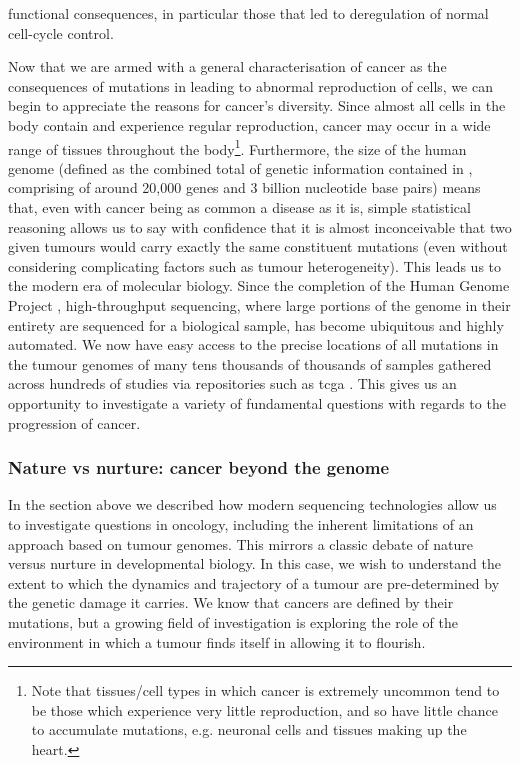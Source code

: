 \documentclass[thesis.tex]{subfiles}
\begin{document}
functional consequences, in particular those that led to deregulation of normal cell-cycle control.

Now that we are armed with a general characterisation of cancer as the consequences of mutations in  leading to abnormal reproduction of cells, we can begin to appreciate the reasons for cancer's diversity. Since almost all cells in the body contain  and experience regular reproduction, cancer may occur in a wide range of tissues throughout the body\footnote{Note that tissues/cell types in which cancer is extremely uncommon tend to be those which experience very little reproduction, and so have little chance to accumulate mutations, e.g. neuronal cells and tissues making up the heart.}. Furthermore, the size of the human genome (defined as the combined total of genetic information contained in , comprising of around 20,000 genes and 3 billion nucleotide base pairs) means that, even with cancer being as common a disease as it is, simple statistical reasoning allows us to say with confidence that it is almost inconceivable that two given tumours would carry exactly the same constituent mutations (even without considering complicating factors such as tumour heterogeneity). This leads us to the modern era of molecular biology. Since the completion of the Human Genome Project \citep{lander_initial_2001}, high-throughput sequencing, where large portions of the genome in their entirety are sequenced for a biological sample, has become ubiquitous and highly automated. We now have easy access to the precise locations of all mutations in the tumour genomes of many tens thousands of thousands of samples gathered across hundreds of studies via repositories such as \gls{tcga} \citep{weinstein_cancer_2013}. This gives us an opportunity to investigate a variety of fundamental questions with regards to the progression of cancer. 

\subsubsection{Nature vs nurture: cancer beyond the genome}
In the section above we described how modern sequencing technologies allow us to investigate questions in oncology, including the inherent limitations of an approach based on tumour genomes. This mirrors a classic debate of nature versus nurture in developmental biology. In this case, we wish to understand the extent to which the dynamics and trajectory of a tumour are pre-determined by the genetic damage it carries. We know that cancers are defined by their mutations, but a growing field of investigation is exploring the role of the environment in which a tumour finds itself in allowing it to flourish. 
\end{document}
